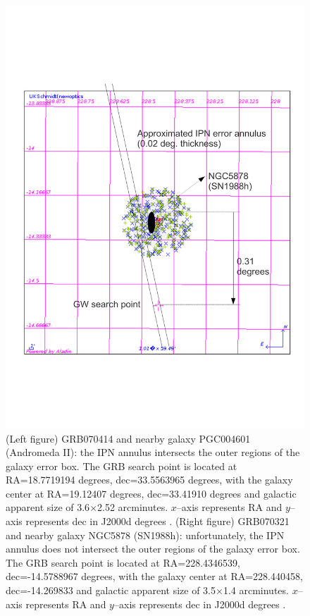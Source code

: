 \begin{figure}[ht!]
\begin{minipage}{0.5\linewidth}
\includegraphics[scale=0.4]{Images/070321_search_point_NGC5878.pdf}
\end{minipage}
\caption{(Left figure) GRB070414 and nearby galaxy PGC004601 (Andromeda II): the IPN annulus intersects the outer regions of the galaxy error box. The GRB search point is located at RA=18.7719194 degrees, dec=33.5563965 degrees, with the galaxy center at RA=19.12407 degrees, dec=33.41910 degrees and galactic apparent size of 3.6$\times$2.52 arcminutes. $x$--axis represents RA and $y$--axis represents dec in J2000d degrees \cite{gwgc, ned}. (Right figure) GRB070321 and nearby galaxy NGC5878 (SN1988h): unfortunately, the IPN annulus does not intersect the outer regions of the galaxy error box. The GRB search point is located at RA=228.4346539, dec=-14.5788967 degrees, with the galaxy center at RA=228.440458, dec=-14.269833 and galactic apparent size of 3.5$\times$1.4 arcminutes. $x$--axis represents RA and $y$--axis represents dec in J2000d degrees \cite{gwgc, ned}.}
\label{ipngalaxies_search_point}
\end{figure}

